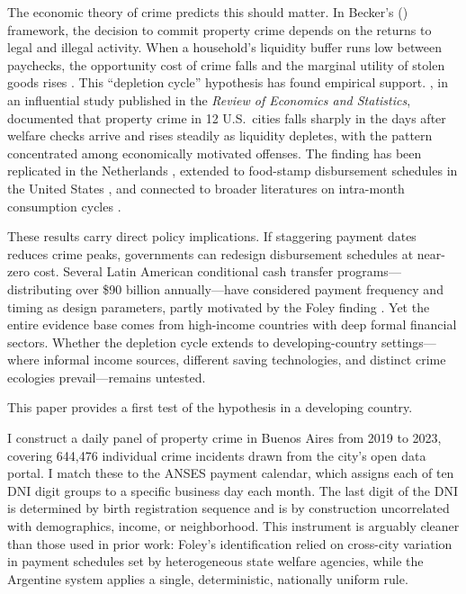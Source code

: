 \documentclass[12pt]{article}
\begin{document}
The economic theory of crime predicts this should matter. In Becker's (\citeyear{becker1968}) framework, the decision to commit property crime depends on the returns to legal and illegal activity. When a household's liquidity buffer runs low between paychecks, the opportunity cost of crime falls and the marginal utility of stolen goods rises \citep{ehrlich1973, grogger1998}. This ``depletion cycle'' hypothesis has found empirical support. \citet{foley2011}, in an influential study published in the \textit{Review of Economics and Statistics}, documented that property crime in 12 U.S.\ cities falls sharply in the days after welfare checks arrive and rises steadily as liquidity depletes, with the pattern concentrated among economically motivated offenses. The finding has been replicated in the Netherlands \citep{stam2024}, extended to food-stamp disbursement schedules in the United States \citep{carr2011}, and connected to broader literatures on intra-month consumption cycles \citep{stephens2003, shapiro2005, mastrobuoni2009}.

These results carry direct policy implications. If staggering payment dates reduces crime peaks, governments can redesign disbursement schedules at near-zero cost. Several Latin American conditional cash transfer programs---distributing over \$90 billion annually---have considered payment frequency and timing as design parameters, partly motivated by the Foley finding \citep{lustig2015}. Yet the entire evidence base comes from high-income countries with deep formal financial sectors. Whether the depletion cycle extends to developing-country settings---where informal income sources, different saving technologies, and distinct crime ecologies prevail---remains untested.

This paper provides a first test of the hypothesis in a developing country.

I construct a daily panel of property crime in Buenos Aires from 2019 to 2023, covering 644,476 individual crime incidents drawn from the city's open data portal. I match these to the ANSES payment calendar, which assigns each of ten DNI digit groups to a specific business day each month. The last digit of the DNI is determined by birth registration sequence and is by construction uncorrelated with demographics, income, or neighborhood. This instrument is arguably cleaner than those used in prior work: Foley's identification relied on cross-city variation in payment schedules set by heterogeneous state welfare agencies, while the Argentine system applies a single, deterministic, nationally uniform rule.
\end{document}
